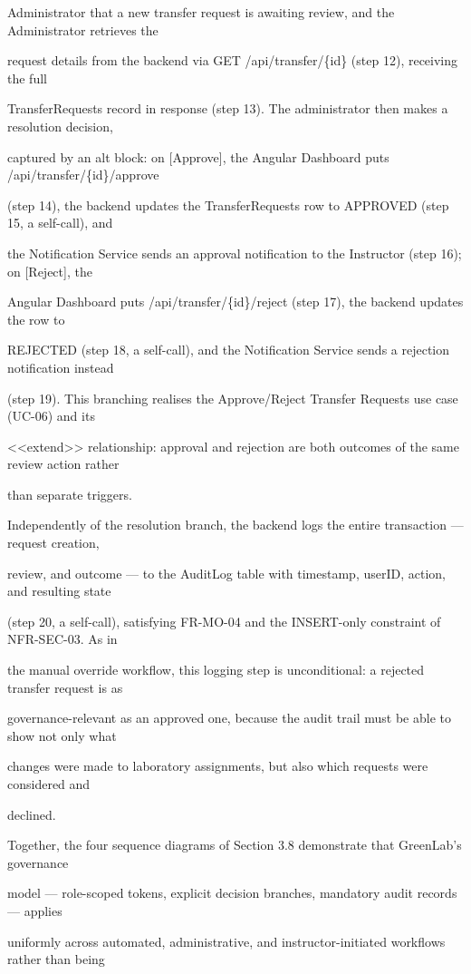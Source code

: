 Administrator that a new transfer request is awaiting review, and the Administrator retrieves the

request details from the backend via GET /api/transfer/\{id\} (step 12), receiving the full

TransferRequests record in response (step 13). The administrator then makes a resolution decision,

captured by an alt block: on [Approve], the Angular Dashboard puts /api/transfer/\{id\}/approve

(step 14), the backend updates the TransferRequests row to APPROVED (step 15, a self-call), and

the Notification Service sends an approval notification to the Instructor (step 16); on [Reject], the

Angular Dashboard puts /api/transfer/\{id\}/reject (step 17), the backend updates the row to

REJECTED (step 18, a self-call), and the Notification Service sends a rejection notification instead

(step 19). This branching realises the Approve/Reject Transfer Requests use case (UC-06) and its

<<extend>> relationship: approval and rejection are both outcomes of the same review action rather

than separate triggers.

Independently of the resolution branch, the backend logs the entire transaction --- request creation,

review, and outcome --- to the AuditLog table with timestamp, userID, action, and resulting state

(step 20, a self-call), satisfying FR-MO-04 and the INSERT-only constraint of NFR-SEC-03. As in

the manual override workflow, this logging step is unconditional: a rejected transfer request is as

governance-relevant as an approved one, because the audit trail must be able to show not only what

changes were made to laboratory assignments, but also which requests were considered and

declined.

Together, the four sequence diagrams of Section 3.8 demonstrate that GreenLab's governance

model --- role-scoped tokens, explicit decision branches, mandatory audit records --- applies

uniformly across automated, administrative, and instructor-initiated workflows rather than being

